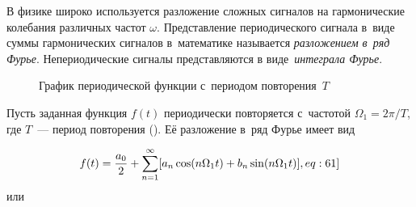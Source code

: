 

В физике широко используется разложение сложных сигналов на гармонические колебания различных частот $\omega$.
Представление периодического сигнала в~виде суммы гармонических сигналов в~математике называется \emph{разложением в~ряд Фурье}. Непериодические сигналы представляются в виде~\emph{интеграла Фурье}.

\begin{figure}
	\centering
	\caption{График периодической функции с~периодом повторения~$T$}
\end{figure}

Пусть заданная функция $f(t)$ периодически повторяется с~частотой $\Omega_1=2\pi/T$, где $T$~--- период повторения
(). Её разложение в~ряд Фурье имеет вид

\begin{equation}
	f(t)=\frac{a_0}{2}+\sum_{n=1}^{\infty}[a_n\cos(n\Omega_1 t)+b_n\sin(n\Omega_1 t)],
	\eqmark[eq:61]
\end{equation}
или

